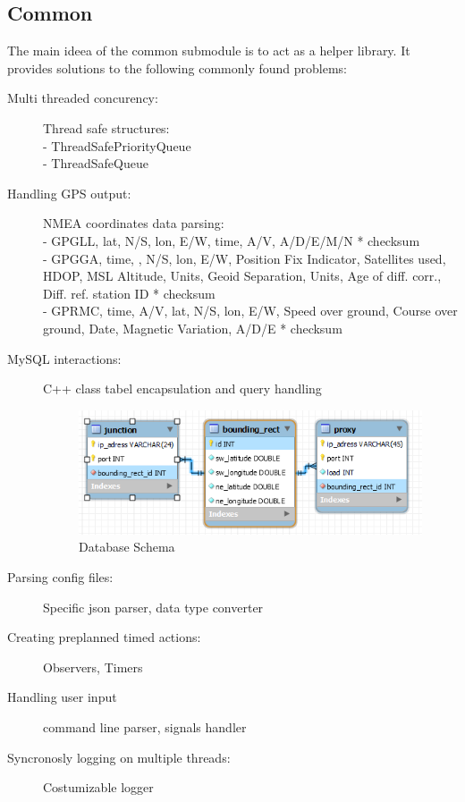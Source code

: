 \documentclass[17pt]{article}
\begin{document}
\subsection{Common}
\indent \indent
The main ideea of the common submodule is to act as a helper library. It provides 
solutions to the following commonly found problems:
\begin{description}
    \item[Multi threaded concurency:] Thread safe structures:\\
    - ThreadSafePriorityQueue\\
    - ThreadSafeQueue
    \item[Handling GPS output:] NMEA coordinates data parsing: \\
    - GPGLL, lat, N/S, lon, E/W, time, A/V, A/D/E/M/N * checksum\\
    - GPGGA, time, , N/S, lon, E/W, Position Fix Indicator, Satellites used, HDOP, MSL Altitude, Units, 
	Geoid Separation, Units, Age of diff. corr., Diff. ref. station ID * checksum\\
    - GPRMC, time, A/V, lat, N/S, lon, E/W, Speed over ground,
    Course over ground, Date, Magnetic Variation, A/D/E * checksum
    \item[MySQL interactions:] C++ class tabel encapsulation and query handling
    \begin{figure}[h!]
        \includegraphics[width=\textwidth]{DB/DbSchema.png}
        \caption{Database Schema}
        \label{fig:Database Schema}
    \end{figure}
    \item[Parsing config files:] Specific json parser, data type converter
    \item[Creating preplanned timed actions:] Observers, Timers 
    \item[Handling user input] command line parser, signals handler
    \item[Syncronosly logging on multiple threads:] Costumizable logger
\end{description}
\end{document}
